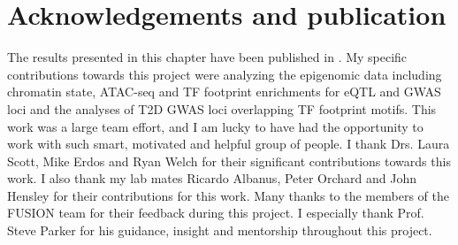 \section{Acknowledgements and publication}
The results presented in this chapter have been published in \cite{varshneyGeneticRegulatorySignatures2017}. My specific contributions towards this project were analyzing the epigenomic data including chromatin state, ATAC-seq and TF footprint enrichments for eQTL and GWAS loci and the analyses of T2D GWAS loci overlapping TF footprint motifs. This work was a large team effort, and I am lucky to have had the opportunity to work with such smart, motivated and helpful group of people. I thank Drs. Laura Scott, Mike Erdos and Ryan Welch for their significant contributions towards this work. I also thank my lab mates Ricardo Albanus, Peter Orchard and John Hensley for their contributions for this work. Many thanks to the members of the FUSION team for their feedback during this project. I especially thank Prof. Steve Parker for his guidance, insight and mentorship throughout this project.


